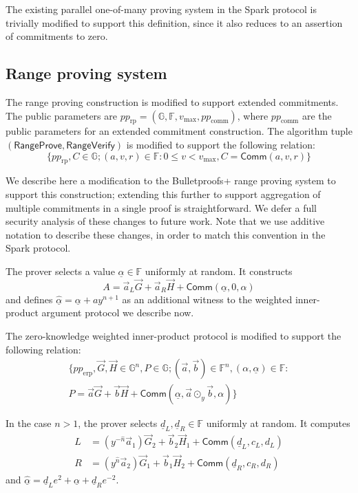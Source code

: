 \documentclass{article}
\newcommand{\G}{\mathbb{G}}
\newcommand{\F}{\mathbb{F}}
\newcommand{\func}[1]{\mathsf{#1}}
\newcommand{\comm}{\func{Comm}}
\begin{document}
The existing parallel one-of-many proving system in the Spark protocol is trivially modified to support this definition, since it also reduces to an assertion of commitments to zero.


\subsection{Range proving system}

The range proving construction is modified to support extended commitments.
The public parameters are $pp_{\text{rp}} = (\G, \F, v_{\text{max}}, pp_{\text{comm}})$, where $pp_{\text{comm}}$ are the public parameters for an extended commitment construction.
The algorithm tuple $(\func{RangeProve}, \func{RangeVerify})$ is modified to support the following relation:
$$\{ pp_{\text{rp}}, C \in \G ; (a, v, r) \in \F : 0 \leq v < v_{\text{max}}, C = \comm(a, v, r) \}$$

We describe here a modification to the Bulletproofs+ range proving system to support this construction; extending this further to support aggregation of multiple commitments in a single proof is straightforward.
We defer a full security analysis of these changes to future work.
Note that we use additive notation to describe these changes, in order to match this convention in the Spark protocol.

The prover selects a value $\underline{\alpha} \in \F$ uniformly at random.
It constructs $$A = \vec{a}_L \vec{G} + \vec{a}_R \vec{H} + \comm(\underline{\alpha}, 0, \alpha)$$ and defines $\widehat{\underline{\alpha}} = \underline{\alpha} + ay^{n+1}$ as an additional witness to the weighted inner-product argument protocol we describe now.

The zero-knowledge weighted inner-product protocol is modified to support the following relation:
\begin{multline*}
\{ pp_{\text{erp}}, \vec{G}, \vec{H} \in \G^n, P \in \G; (\vec{a}, \vec{b}) \in \F^n, (\alpha, \underline{\alpha}) \in \F : \\
P = \vec{a}\vec{G} + \vec{b}\vec{H} + \comm(\underline{\alpha}, \vec{a} \odot_y \vec{b}, \alpha) \}
\end{multline*}

In the case $n > 1$, the prover selects $\underline{d}_L, \underline{d}_R \in \F$ uniformly at random.
It computes
\begin{align*}
    L &= (y^{-\widehat{n}}\vec{a}_1)\vec{G}_2 + \vec{b}_2 \vec{H}_1 + \comm(\underline{d}_L, c_L, d_L) \\
    R &= (y^{\widehat{n}}\vec{a}_2)\vec{G}_1 + \vec{b}_1 \vec{H}_2 + \comm(\underline{d}_R, c_R, d_R)
\end{align*}
and $\widehat{\underline{\alpha}} = \underline{d}_L e^2 + \underline{\alpha} + \underline{d}_R e^{-2}$.
\end{document}
